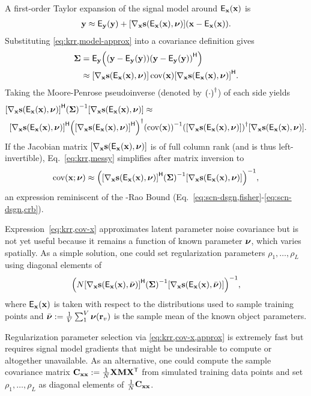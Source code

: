 A first-order Taylor expansion
of the signal model 
around $\expect{\bmx}{\bmx}$ is
\begin{align}
	\bmy \approx \expect{\bmy}{\bmy} + 
		\gradxs \paren{\bmx - \expect{\bmx}{\bmx}}.
	\label{eq:krr,model-approx}
\end{align}
Substituting \eqref{eq:krr,model-approx}
into a covariance definition gives
\begin{align}
	\bmSig &= 
		\expect{\bmy}{
			\paren{\bmy - \expect{\bmy}{\bmy}}
			\paren{\bmy - \expect{\bmy}{\bmy}}\ctpose
		}
		\nonumber \\
		&\approx \gradxs \cov{\bmx} \gradxs\ctpose.
		\label{eq:krr,cov-y}
\end{align}
Taking the Moore-Penrose pseudoinverse 
(denoted by $\pinv{\cdot}$)
of each side yields 
\begin{align}
	\gradxs\ctpose \inv{\bmSig} \gradxs &\approx 
		\label{eq:krr,messy} \\
	\gradxs\ctpose \pinv{\gradxs\ctpose} &\inv{\cov{\bmx}} \pinv{\gradxs} \gradxs.
		\nonumber
\end{align}
If the Jacobian matrix $\gradxs$ 
is of full column rank
(and is thus left-invertible), 
Eq.~\eqref{eq:krr,messy} simplifies
after matrix inversion to
\begin{align}
	\cov{\bmx; \bmnu} \approx \inv{\gradxs\ctpose \inv{\bmSig} \gradxs},
	\label{eq:krr,cov-x}
\end{align}
an expression reminiscent
of the \Cramer-Rao Bound 
(\cf Eq.~\eqref{eq:scn-dsgn,fisher}-\eqref{eq:scn-dsgn,crb}).

Expression~\eqref{eq:krr,cov-x} approximates
latent parameter noise covariance 
but is not yet useful
because it remains a function 
of known parameter $\boldsymbol{\nu}$,
which varies spatially.
As a simple solution,
one could set regularization parameters $\rho_1,\dots,\rho_L$
using diagonal elements of
\begin{align}
	\inv{N \gradxvs\ctpose \inv{\bmSig} \gradxvs},
	\label{eq:krr,cov-x,approx}
\end{align}
where $\expx$ is taken
with respect to 
the distributions 
used to sample training points 
and $\nubar := \frac{1}{V} \sum_1^V \bmnu\paren{\bmr_v}$
is the sample mean 
of the known object parameters.

Regularization parameter selection 
via \eqref{eq:krr,cov-x,approx}
is extremely fast
but requires signal model gradients
that might be undesirable to compute
or altogether unavailable.
As an alternative,
one could compute the sample covariance matrix
$\mathbf{C}_{\mathbf{x}\mathbf{x}} := \frac{1}{N}\mathbf{X} \mathbf{M} \mathbf{X}^{\mathsf{T}}$
from simulated training data points 
and set $\rho_1,\dots,\rho_L$
as diagonal elements of $\frac{1}{N}\mathbf{C}_{\mathbf{x}\mathbf{x}}$.

